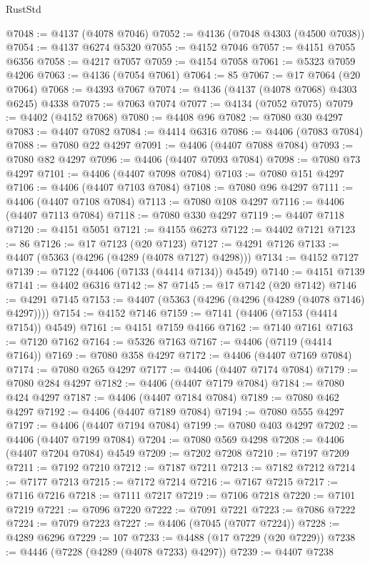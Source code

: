 \begin{lexlean}{RustStd}
\begin{coremodule}
{\begin{coremodule}
{{{{{{{{{{{{{{{{{{{{{{{{{{{{{{{{{{{{{{{{{{{{{{{{{{@7048 := @4137 (@4078 @7046)
@7052 := @4136 (@7048 @4303 (@4500 @7038))
@7054 := @4137 @6274 @5320
@7055 := @4152 @7046
@7057 := @4151 @7055 @6356
@7058 := @4217 @7057
@7059 := @4154 @7058
@7061 := @5323 @7059 @4206
@7063 := @4136 (@7054 @7061)
@7064 := 85
@7067 := @17 @7064 (@20 @7064)
@7068 := @4393 @7067
@7074 := @4136 (@4137 (@4078 @7068) @4303 @6245) @4338
@7075 := @7063 @7074
@7077 := @4134 (@7052 @7075)
@7079 := @4402 (@4152 @7068)
@7080 := @4408 @96
@7082 := @7080 @30 @4297
@7083 := @4407 @7082
@7084 := @4414 @6316
@7086 := @4406 (@7083 @7084)
@7088 := @7080 @22 @4297
@7091 := @4406 (@4407 @7088 @7084)
@7093 := @7080 @82 @4297
@7096 := @4406 (@4407 @7093 @7084)
@7098 := @7080 @73 @4297
@7101 := @4406 (@4407 @7098 @7084)
@7103 := @7080 @151 @4297
@7106 := @4406 (@4407 @7103 @7084)
@7108 := @7080 @96 @4297
@7111 := @4406 (@4407 @7108 @7084)
@7113 := @7080 @108 @4297
@7116 := @4406 (@4407 @7113 @7084)
@7118 := @7080 @330 @4297
@7119 := @4407 @7118
@7120 := @4151 @5051
@7121 := @4155 @6273
@7122 := @4402 @7121
@7123 := 86
@7126 := @17 @7123 (@20 @7123)
@7127 := @4291 @7126
@7133 := @4407 (@5363 (@4296 (@4289 (@4078 @7127) @4298)))
@7134 := @4152 @7127
@7139 := @7122 (@4406 (@7133 (@4414 @7134)) @4549)
@7140 := @4151 @7139
@7141 := @4402 @6316
@7142 := 87
@7145 := @17 @7142 (@20 @7142)
@7146 := @4291 @7145
@7153 := @4407 (@5363 (@4296 (@4296 (@4289 (@4078 @7146) @4297))))
@7154 := @4152 @7146
@7159 := @7141 (@4406 (@7153 (@4414 @7154)) @4549)
@7161 := @4151 @7159 @4166
@7162 := @7140 @7161
@7163 := @7120 @7162
@7164 := @5326 @7163
@7167 := @4406 (@7119 (@4414 @7164))
@7169 := @7080 @358 @4297
@7172 := @4406 (@4407 @7169 @7084)
@7174 := @7080 @265 @4297
@7177 := @4406 (@4407 @7174 @7084)
@7179 := @7080 @284 @4297
@7182 := @4406 (@4407 @7179 @7084)
@7184 := @7080 @424 @4297
@7187 := @4406 (@4407 @7184 @7084)
@7189 := @7080 @462 @4297
@7192 := @4406 (@4407 @7189 @7084)
@7194 := @7080 @555 @4297
@7197 := @4406 (@4407 @7194 @7084)
@7199 := @7080 @403 @4297
@7202 := @4406 (@4407 @7199 @7084)
@7204 := @7080 @569 @4298
@7208 := @4406 (@4407 @7204 @7084) @4549
@7209 := @7202 @7208
@7210 := @7197 @7209
@7211 := @7192 @7210
@7212 := @7187 @7211
@7213 := @7182 @7212
@7214 := @7177 @7213
@7215 := @7172 @7214
@7216 := @7167 @7215
@7217 := @7116 @7216
@7218 := @7111 @7217
@7219 := @7106 @7218
@7220 := @7101 @7219
@7221 := @7096 @7220
@7222 := @7091 @7221
@7223 := @7086 @7222
@7224 := @7079 @7223
@7227 := @4406 (@7045 (@7077 @7224))
@7228 := @4289 @6296
@7229 := 107
@7233 := @4488 (@17 @7229 (@20 @7229))
@7238 := @4446 (@7228 (@4289 (@4078 @7233) @4297))
@7239 := @4407 @7238
}}}}}}}}}}}}}}}}}}}}}}}}}}}}}}}}}}}}}}}}}}}}}}}}}}
\end{coremodule}}
\end{coremodule}
\end{lexlean}
